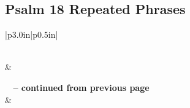 \subsection{Psalm 18 Repeated Phrases}


\normalsize
 
\begin{center}
\begin{longtable}{|p{3.0in}|p{0.5in}|}
\caption[Psalm 18 Repeated Phrases]{Psalm 18 Repeated Phrases}\label{table:Repeated Phrases Psalm 18} \\
\hline {} &  \\ \hline 
\endfirsthead
 
{{\bfseries \tablename\ \thetable{} -- continued from previous page}} \\  
\hline {} &  \\ \hline 
\endhead
 

\end{longtable}
\end{center}
